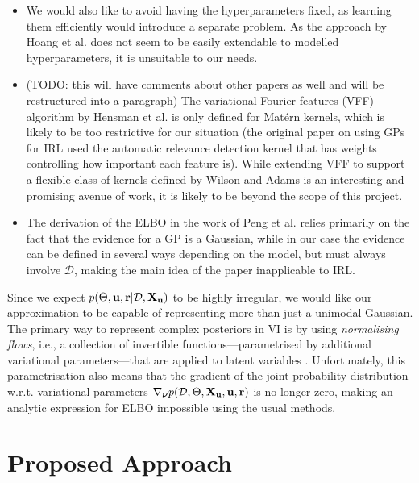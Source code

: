 \documentclass{mprop}
\theoremstyle{definition}
\begin{document}
\begin{itemize}
\item We would also like to avoid having the hyperparameters fixed, as learning
  them efficiently would introduce a separate problem. As the approach by Hoang
  et al. does not seem to be easily extendable to modelled hyperparameters, it
  is unsuitable to our needs.
\item (TODO: this will have comments about other papers as well and will be
  restructured into a paragraph) The variational Fourier features (VFF)
  algorithm by Hensman et al. \cite{DBLP:journals/jmlr/HensmanDS17} is only
  defined for Mat\'ern kernels, which is likely to be too restrictive for our
  situation (the original paper on using GPs for IRL
  \cite{DBLP:conf/nips/LevinePK11} used the automatic relevance detection kernel
  that has weights controlling how important each feature is). While extending
  VFF to support a flexible class of kernels defined by Wilson and Adams
  \cite{pmlr-v28-wilson13} is an interesting and promising avenue of work, it is
  likely to be beyond the scope of this project.
\item The derivation of the ELBO in the work of Peng et al.
  \cite{DBLP:conf/icml/PengZZQ17} relies primarily on the fact that the evidence
  for a GP is a Gaussian, while in our case the evidence can be defined in
  several ways depending on the model, but must always involve $\mathcal{D}$,
  making the main idea of the paper inapplicable to IRL.
\end{itemize}

Since we expect $p(\Theta, \mathbf{u}, \mathbf{r} | \mathcal{D}, \mathbf{X_u})$ to be highly irregular, we would like our
approximation to be capable of representing more than just a unimodal Gaussian.
The primary way to represent complex posteriors in VI is by using
\emph{normalising flows}, i.e., a collection of invertible
functions---parametrised by additional variational parameters---that are applied
to latent variables \cite{DBLP:conf/icml/RezendeM15}. Unfortunately, this
parametrisation also means that the gradient of the joint probability
distribution w.r.t. variational parameters $\nabla_{\bm\nu}p(\mathcal{D}, \Theta, \mathbf{X_u}, \mathbf{u}, \mathbf{r})$ is no
longer zero, making an analytic expression for ELBO impossible using the usual
methods. %

\section{Proposed Approach} \label{sec:proposed_approach}
\end{document}
